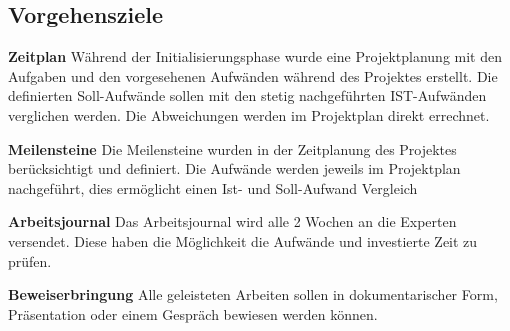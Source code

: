 \subsection{Vorgehensziele}

\textbf{Zeitplan}
\newline
Während der Initialisierungsphase wurde eine Projektplanung mit den Aufgaben und den vorgesehenen Aufwänden während des Projektes erstellt. Die definierten Soll-Aufwände sollen mit den stetig nachgeführten IST-Aufwänden verglichen werden. Die Abweichungen werden im Projektplan direkt errechnet.

\textbf{Meilensteine}
\newline
Die Meilensteine wurden in der Zeitplanung des Projektes berücksichtigt und definiert. Die Aufwände werden jeweils im Projektplan nachgeführt, dies ermöglicht einen Ist- und Soll-Aufwand Vergleich

\textbf{Arbeitsjournal}
\newline
Das Arbeitsjournal wird alle 2 Wochen an die Experten versendet. Diese haben die Möglichkeit die Aufwände und investierte Zeit zu prüfen.

\textbf{Beweiserbringung}
\newline
Alle geleisteten Arbeiten sollen in dokumentarischer Form, Präsentation oder einem Gespräch bewiesen werden können.